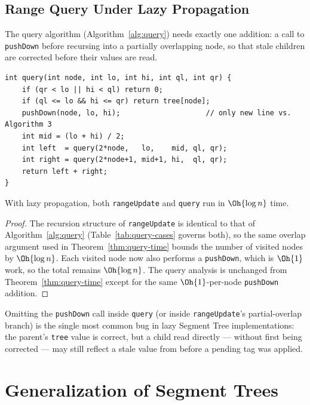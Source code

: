 \section{Range Query Under Lazy Propagation}
The query algorithm (Algorithm~\ref{alg:query}) needs exactly one addition: a call to \texttt{pushDown} before recursing into a partially overlapping node, so that stale children are corrected before their values are read.

\begin{lstlisting}[style=cpp, caption={Range query, adapted for a tree with lazy tags.}, label={alg:lazyquery}]
int query(int node, int lo, int hi, int ql, int qr) {
    if (qr < lo || hi < ql) return 0;
    if (ql <= lo && hi <= qr) return tree[node];
    pushDown(node, lo, hi);                    // only new line vs. Algorithm 3
    int mid = (lo + hi) / 2;
    int left  = query(2*node,   lo,    mid, ql, qr);
    int right = query(2*node+1, mid+1, hi,  ql, qr);
    return left + right;
}
\end{lstlisting}

\begin{lem}\label{lem:lazy-time}
With lazy propagation, both \texttt{rangeUpdate} and \texttt{query} run in $\Oh{\log n}$ time.
\end{lem}
\begin{proof}
The recursion structure of \texttt{rangeUpdate} is identical to that of Algorithm~\ref{alg:query} (Table~\ref{tab:query-cases} governs both), so the same overlap argument used in Theorem~\ref{thm:query-time} bounds the number of visited nodes by $\Oh{\log n}$. Each visited node now also performs a \texttt{pushDown}, which is $\Oh{1}$ work, so the total remains $\Oh{\log n}$. The query analysis is unchanged from Theorem~\ref{thm:query-time} except for the same $\Oh{1}$-per-node \texttt{pushDown} addition.
\end{proof}

\begin{pitfall}
Omitting the \texttt{pushDown} call inside \texttt{query} (or inside \texttt{rangeUpdate}'s partial-overlap branch) is the single most common bug in lazy Segment Tree implementations: the parent's \texttt{tree} value is correct, but a child read directly --- without first being corrected --- may still reflect a stale value from before a pending tag was applied.
\end{pitfall}

\chapter{Generalization of Segment Trees}
\label{ch:general}

